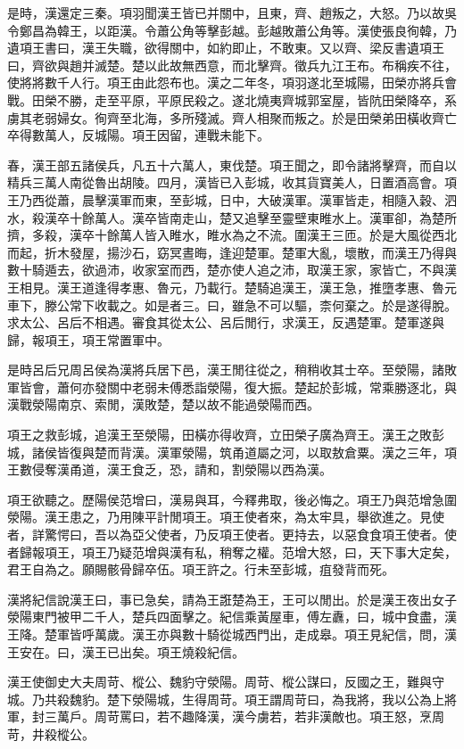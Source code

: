 是時，漢還定三秦。項羽聞漢王皆已并關中，且東，齊、趙叛之，大怒。乃以故吳令鄭昌為韓王，以距漢。令蕭公角等擊彭越。彭越敗蕭公角等。漢使張良徇韓，乃遺項王書曰，漢王失職，欲得關中，如約即止，不敢東。又以齊、梁反書遺項王曰，齊欲與趙并滅楚。楚以此故無西意，而北擊齊。徵兵九江王布。布稱疾不往，使將將數千人行。項王由此怨布也。漢之二年冬，項羽遂北至城陽，田榮亦將兵會戰。田榮不勝，走至平原，平原民殺之。遂北燒夷齊城郭室屋，皆阬田榮降卒，系虜其老弱婦女。徇齊至北海，多所殘滅。齊人相聚而叛之。於是田榮弟田橫收齊亡卒得數萬人，反城陽。項王因留，連戰未能下。

春，漢王部五諸侯兵，凡五十六萬人，東伐楚。項王聞之，即令諸將擊齊，而自以精兵三萬人南從魯出胡陵。四月，漢皆已入彭城，收其貨寶美人，日置酒高會。項王乃西從蕭，晨擊漢軍而東，至彭城，日中，大破漢軍。漢軍皆走，相隨入穀、泗水，殺漢卒十餘萬人。漢卒皆南走山，楚又追擊至靈壁東睢水上。漢軍卻，為楚所擠，多殺，漢卒十餘萬人皆入睢水，睢水為之不流。圍漢王三匝。於是大風從西北而起，折木發屋，揚沙石，窈冥晝晦，逢迎楚軍。楚軍大亂，壞散，而漢王乃得與數十騎遁去，欲過沛，收家室而西，楚亦使人追之沛，取漢王家，家皆亡，不與漢王相見。漢王道逢得孝惠、魯元，乃載行。楚騎追漢王，漢王急，推墮孝惠、魯元車下，滕公常下收載之。如是者三。曰，雖急不可以驅，柰何棄之。於是遂得脫。求太公、呂后不相遇。審食其從太公、呂后閒行，求漢王，反遇楚軍。楚軍遂與歸，報項王，項王常置軍中。

是時呂后兄周呂侯為漢將兵居下邑，漢王閒往從之，稍稍收其士卒。至滎陽，諸敗軍皆會，蕭何亦發關中老弱未傅悉詣滎陽，復大振。楚起於彭城，常乘勝逐北，與漢戰滎陽南京、索閒，漢敗楚，楚以故不能過滎陽而西。

項王之救彭城，追漢王至滎陽，田橫亦得收齊，立田榮子廣為齊王。漢王之敗彭城，諸侯皆復與楚而背漢。漢軍滎陽，筑甬道屬之河，以取敖倉粟。漢之三年，項王數侵奪漢甬道，漢王食乏，恐，請和，割滎陽以西為漢。

項王欲聽之。歷陽侯范增曰，漢易與耳，今釋弗取，後必悔之。項王乃與范增急圍滎陽。漢王患之，乃用陳平計閒項王。項王使者來，為太牢具，舉欲進之。見使者，詳驚愕曰，吾以為亞父使者，乃反項王使者。更持去，以惡食食項王使者。使者歸報項王，項王乃疑范增與漢有私，稍奪之權。范增大怒，曰，天下事大定矣，君王自為之。願賜骸骨歸卒伍。項王許之。行未至彭城，疽發背而死。

漢將紀信說漢王曰，事已急矣，請為王誑楚為王，王可以閒出。於是漢王夜出女子滎陽東門被甲二千人，楚兵四面擊之。紀信乘黃屋車，傅左纛，曰，城中食盡，漢王降。楚軍皆呼萬歲。漢王亦與數十騎從城西門出，走成皋。項王見紀信，問，漢王安在。曰，漢王已出矣。項王燒殺紀信。

漢王使御史大夫周苛、樅公、魏豹守滎陽。周苛、樅公謀曰，反國之王，難與守城。乃共殺魏豹。楚下滎陽城，生得周苛。項王謂周苛曰，為我將，我以公為上將軍，封三萬戶。周苛罵曰，若不趣降漢，漢今虜若，若非漢敵也。項王怒，烹周苛，井殺樅公。

